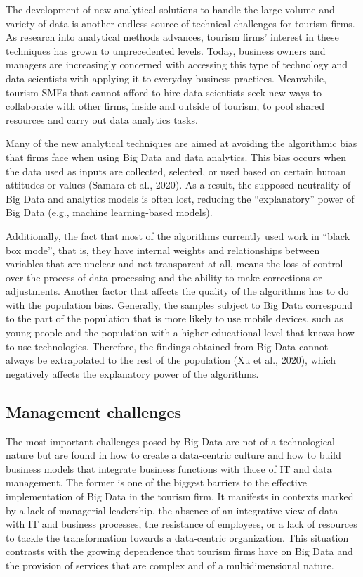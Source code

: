 \documentclass[
  letterpaper,
  DIV=11,
  numbers=noendperiod]{scrreprt}
\begin{document}
The development of new analytical solutions to handle the large volume
and variety of data is another endless source of technical challenges
for tourism firms. As research into analytical methods advances, tourism
firms' interest in these techniques has grown to unprecedented levels.
Today, business owners and managers are increasingly concerned with
accessing this type of technology and data scientists with applying it
to everyday business practices. Meanwhile, tourism SMEs that cannot
afford to hire data scientists seek new ways to collaborate with other
firms, inside and outside of tourism, to pool shared resources and carry
out data analytics tasks.

Many of the new analytical techniques are aimed at avoiding the
algorithmic bias that firms face when using Big Data and data analytics.
This bias occurs when the data used as inputs are collected, selected,
or used based on certain human attitudes or values (Samara et al.,
2020). As a result, the supposed neutrality of Big Data and analytics
models is often lost, reducing the ``explanatory'' power of Big Data
(e.g., machine learning-based models).

Additionally, the fact that most of the algorithms currently used work
in ``black box mode'', that is, they have internal weights and
relationships between variables that are unclear and not transparent at
all, means the loss of control over the process of data processing and
the ability to make corrections or adjustments. Another factor that
affects the quality of the algorithms has to do with the population
bias. Generally, the samples subject to Big Data correspond to the part
of the population that is more likely to use mobile devices, such as
young people and the population with a higher educational level that
knows how to use technologies. Therefore, the findings obtained from Big
Data cannot always be extrapolated to the rest of the population (Xu et
al., 2020), which negatively affects the explanatory power of the
algorithms.

\hypertarget{management-challenges}{%
\subsection{Management challenges}\label{management-challenges}}

The most important challenges posed by Big Data are not of a
technological nature but are found in how to create a data-centric
culture and how to build business models that integrate business
functions with those of IT and data management. The former is one of the
biggest barriers to the effective implementation of Big Data in the
tourism firm. It manifests in contexts marked by a lack of managerial
leadership, the absence of an integrative view of data with IT and
business processes, the resistance of employees, or a lack of resources
to tackle the transformation towards a data-centric organization. This
situation contrasts with the growing dependence that tourism firms have
on Big Data and the provision of services that are complex and of a
multidimensional nature.
\end{document}
